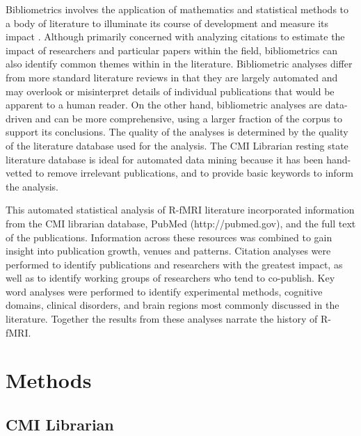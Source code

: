 \documentclass[12pt,3p,review,number]{elsarticle}
\begin{document}
Bibliometrics involves the application of mathematics and statistical methods to
a body of literature to illuminate its course of development and measure its
impact \cite{Pritchard1969}. Although primarily concerned with analyzing citations
to estimate the impact of researchers and particular papers within the field,
bibliometrics can also identify common themes within in the literature.
Bibliometric analyses differ from more standard literature reviews in that they
are largely automated and may overlook or misinterpret details of individual
publications that would be apparent to a human reader. On the other hand,
bibliometric analyses are data-driven and can be more comprehensive, using a
larger fraction of the corpus to support its conclusions. The quality of the
analyses is determined by the quality of the literature database used for the
analysis. The CMI Librarian resting state literature database is ideal for
automated data mining because it has been hand-vetted to remove irrelevant
publications, and to provide basic keywords to inform the analysis.

This automated statistical analysis of R-fMRI literature incorporated
information from the CMI librarian database, PubMed (http://pubmed.gov), and the
full text of the publications. Information across these resources was combined
to gain insight into publication growth, venues and patterns. Citation analyses
were performed to identify publications and researchers with the greatest
impact, as well as to identify working groups of researchers who tend to
co-publish. Key word analyses were performed to identify experimental methods,
cognitive domains, clinical disorders, and brain regions most commonly discussed
in the literature. Together the results from these analyses narrate the history
of R-fMRI.

\section{Methods}

\subsection{CMI Librarian}
\end{document}
